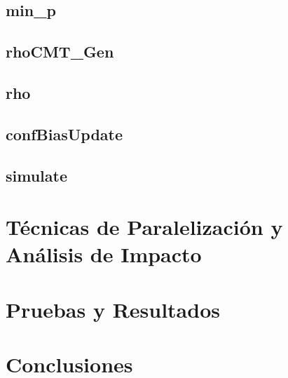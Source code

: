 \documentclass{article}
\begin{document}
\subsection{min_p}

\subsection{rhoCMT_Gen}

\subsection{rho}

\subsection{confBiasUpdate}

\subsection{simulate}

\section{Técnicas de Paralelización y Análisis de Impacto}

\section{Pruebas y Resultados}

\section{Conclusiones}
\end{document}

